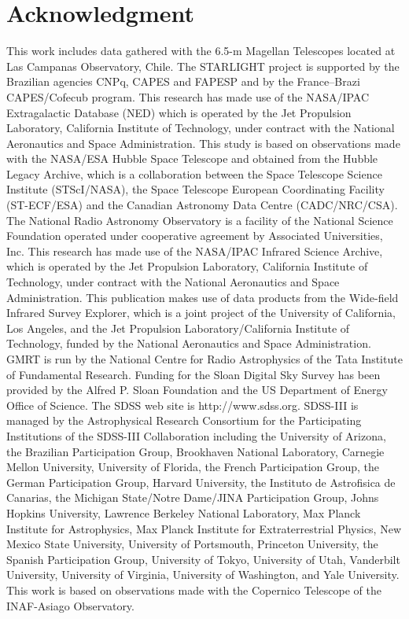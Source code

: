 \documentclass[../main.tex]{subfiles}
\begin{document}
\chapter{Acknowledgment}
\label{cap:aknowledgement}

This work includes data gathered with the 6.5-m Magellan Telescopes located at Las Campanas Observatory, Chile. 
The STARLIGHT project is supported by the Brazilian agencies CNPq, CAPES and FAPESP and by the France–Brazi CAPES/Cofecub program. 
This research has made use of the NASA/IPAC Extragalactic Database (NED) which is operated by the Jet Propulsion Laboratory, California Institute of Technology, under contract with the National Aeronautics and Space Administration. 
This study is based on observations made with the NASA/ESA
Hubble Space Telescope and obtained from the Hubble Legacy Archive, which is a collaboration between the Space Telescope Science Institute (STScI/NASA), the Space Telescope European Coordinating Facility (ST-ECF/ESA) and the
Canadian Astronomy Data Centre (CADC/NRC/CSA).
The National Radio Astronomy Observatory is a facility of the National Science Foundation operated under cooperative agreement by Associated Universities, Inc. 
This research has made use of the NASA/IPAC Infrared Science Archive, which is operated by the Jet Propulsion Laboratory, California Institute of Technology, under contract with the National Aeronautics and Space Administration. 
This publication makes use of data products from the Wide-field Infrared Survey Explorer, which is a joint project of the University of California, Los Angeles, and the Jet Propulsion Laboratory/California Institute of Technology, funded by the National Aeronautics and Space Administration.
GMRT is run by the National Centre for Radio Astrophysics of the Tata Institute of Fundamental Research. 
Funding for the Sloan Digital Sky Survey has been provided by the Alfred P. Sloan Foundation and the US Department of Energy Office of Science. The SDSS web site is http://www.sdss.org. SDSS-III is managed by the Astrophysical Research Consortium for the Participating Institutions of the SDSS-III Collaboration including the University of Arizona, the Brazilian Participation Group, Brookhaven National Laboratory, Carnegie Mellon University, University of Florida, the French Participation Group, the German Participation Group, Harvard University, the Instituto de Astrofisica de Canarias, the Michigan State/Notre Dame/JINA Participation Group, Johns Hopkins University, Lawrence Berkeley National Laboratory, Max Planck Institute for Astrophysics,  Max  Planck  Institute  for  Extraterrestrial  Physics,  New  Mexico  State University, University of Portsmouth, Princeton University, the Spanish Participation Group, University of Tokyo, University of Utah, Vanderbilt University, University of Virginia, University of Washington, and Yale University.
This work is based on observations made with the Copernico Telescope of the INAF-Asiago Observatory.
\end{document}
